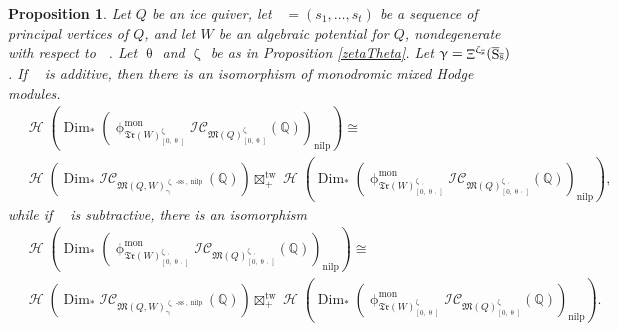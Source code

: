 \documentclass[a4paper,10pt]{amsart}
\newtheorem{proposition}[theorem]{Proposition}
\DeclareMathOperator{\Simp}{S}
\newcommand{\WWW}{\mathfrak{Tr}(W)}
\newcommand{\Mst}{\mathfrak{M}}
\newcommand{\ICS}{\mathcal{IC}}
\newcommand{\phim}[1]{\phi^{\mon}_{#1}}
\newcommand{\shave}{\overline{\Simp}_{\Ss}}
\renewcommand{\theta}{\uptheta}
\renewcommand{\gamma}{\upgamma}
\renewcommand{\zeta}{\upzeta}
\renewcommand{\phi}{\upphi}
\DeclareMathOperator{\sst}{-ss}
\DeclareMathOperator{\nilp}{nilp}
\DeclareMathOperator{\Dim}{Dim}
\DeclareMathOperator{\tw}{tw}
\DeclareMathOperator{\mon}{mon}
\DeclareMathOperator{\Mu}{\Upxi}
\DeclareMathOperator{\Ss}{\overline{s}}
\DeclareMathOperator{\Ho}{\mathcal{H}}
\begin{document}
\begin{proposition}
Let $Q$ be an ice quiver, let $\Ss=(s_1,\ldots,s_t)$ be a sequence of principal vertices of $Q$, and let $W$ be an algebraic potential for $Q$, nondegenerate with respect to $\Ss$.  Let $\theta_{\Ss}$ and $\zeta_{\Ss}$ be as in Proposition \ref{zetaTheta}.  Let $\gamma=\Mu^{\zeta_{\Ss}}(\shave)$.  If $\Ss$ is additive, then there is an isomorphism of monodromic mixed Hodge modules.
\begin{align}
\label{indIso1}
&\Ho\left(\Dim_* \left(\phim{\WWW^{\zeta_{\Ss}}_{[0,\theta_{\Ss}]}}\ICS_{\Mst(Q)_{[0,\theta_{\Ss}]}^{\zeta_{\Ss}}}(\mathbb{Q})\right)_{\nilp}\right)\cong \\
&\Ho\left(\Dim_*\ICS_{\Mst(Q,W)_{\gamma}^{\zeta_{\Ss}\sst,\nilp}}(\mathbb{Q})\right)\boxtimes^{\tw}_+\Ho\left(\Dim_* \left(\phim{\WWW_{[0,\theta_{\Ss'}]}^{\zeta_{\Ss'}} }\ICS_{\Mst(Q)_{[0,\theta_{\Ss'}]}^{\zeta_{\Ss'}} }(\mathbb{Q})\right)_{\nilp}\right),\nonumber
\end{align}
while if $\Ss$ is subtractive, there is an isomorphism
\begin{align}
\label{indIso2}
&\Ho\left(\Dim_* \left(\phim{\WWW_{[0,\theta_{\Ss'}]}^{\zeta_{\Ss'}} }\ICS_{\Mst(Q)_{[0,\theta_{\Ss'}]}^{\zeta_{\Ss'}} }(\mathbb{Q})\right)_{\nilp}\right)\cong \\
&\Ho\left(\Dim_*\ICS_{\Mst(Q,W)_{\gamma}^{\zeta_{\Ss}\sst,\nilp}}(\mathbb{Q})\right)\boxtimes^{\tw}_+\Ho\left(\Dim_* \left(\phim{\WWW^{\zeta_{\Ss}}_{[0,\theta_{\Ss}]}}\ICS_{\Mst(Q)_{[0,\theta_{\Ss}]}^{\zeta_{\Ss}}}(\mathbb{Q})\right)_{\nilp}\right).\nonumber
\end{align}
\end{proposition}
\end{document}

